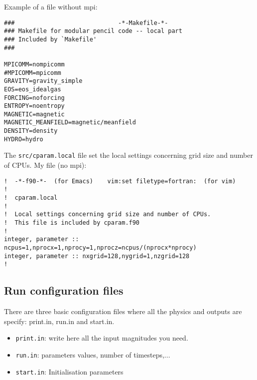 \documentclass[a4paper,12pt]{article}
\begin{document}
Example of a file without mpi:
\begin{verbatim}
###                             -*-Makefile-*-
### Makefile for modular pencil code -- local part
### Included by `Makefile'
###

MPICOMM=nompicomm
#MPICOMM=mpicomm
GRAVITY=gravity_simple
EOS=eos_idealgas
FORCING=noforcing
ENTROPY=noentropy
MAGNETIC=magnetic
MAGNETIC_MEANFIELD=magnetic/meanfield
DENSITY=density
HYDRO=hydro
\end{verbatim}

The \texttt{src/cparam.local} file set the local settings concerning grid size
and number of CPUs. My file (no mpi):
\begin{verbatim}
!  -*-f90-*-  (for Emacs)    vim:set filetype=fortran:  (for vim)
!
!  cparam.local
!
!  Local settings concerning grid size and number of CPUs.
!  This file is included by cparam.f90
!
integer, parameter :: ncpus=1,nprocx=1,nprocy=1,nprocz=ncpus/(nprocx*nprocy)
integer, parameter :: nxgrid=128,nygrid=1,nzgrid=128
!
\end{verbatim}

\subsection{Run configuration files}

There are three basic configuration files where all the physics and outputs are specify: print.in, run.in and start.in.
\begin{itemize}
 \item \verb|print.in|: write here all the input magnitudes you need.
  \item \verb|run.in|: parameters values, number of timesteps,...
  \item \verb|start.in|: Initialisation parameters
\end{itemize}



%
%
\end{document}
